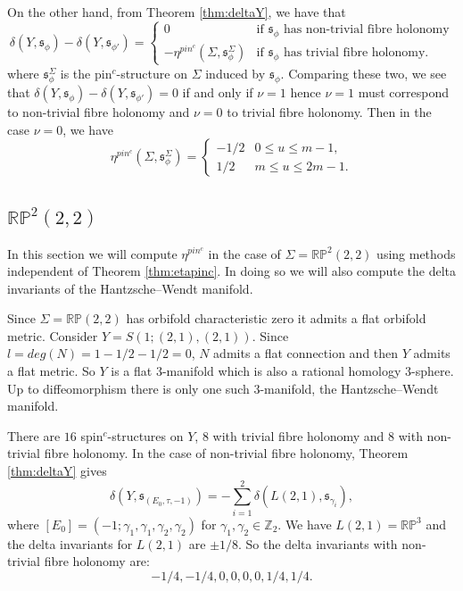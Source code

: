 \documentclass{amsart}
\theoremstyle{definition}
\theoremstyle{remark}
\numberwithin{equation}{section}
\begin{document}
On the other hand, from Theorem \ref{thm:deltaY}, we have that
\[
\delta(Y , \mathfrak{s}_\phi) - \delta(Y , \mathfrak{s}_{\phi'}) = \begin{cases} 0 & \text{if } \mathfrak{s}_\phi \text{ has non-trivial fibre holonomy} \\
-\eta^{pin^c}(\Sigma , \mathfrak{s}^\Sigma_\phi) & \text{if } \mathfrak{s}_\phi \text{ has trivial fibre holonomy}. \end{cases}
\]
where $\mathfrak{s}^\Sigma_\phi$ is the pin$^c$-structure on $\Sigma$ induced by $\mathfrak{s}_\phi$. Comparing these two, we see that $\delta(Y , \mathfrak{s}_\phi) - \delta(Y , \mathfrak{s}_{\phi'}) = 0$ if and only if $\nu = 1$ hence $\nu = 1$ must correspond to non-trivial fibre holonomy and $\nu = 0$ to trivial fibre holonomy. Then in the case $\nu = 0$, we have
\[
\eta^{pin^c}(\Sigma , \mathfrak{s}^\Sigma_\phi) = \begin{cases} -1/2 & 0 \le u \le m-1, \\ 1/2 & m \le u \le 2m-1. \end{cases}
\]




\subsection{$\mathbb{RP}^2(2,2)$}\label{sec:rp22}

In this section we will compute $\eta^{pin^c}$ in the case of $\Sigma = \mathbb{RP}^2(2,2)$ using methods independent of Theorem \ref{thm:etapinc}. In doing so we will also compute the delta invariants of the Hantzsche--Wendt manifold.

Since $\Sigma = \mathbb{RP}(2,2)$ has orbifold characteristic zero it admits a flat orbifold metric. Consider $Y = S( 1 ; (2,1) , (2,1) )$. Since $l = deg(N) = 1 - 1/2 - 1/2 = 0$, $N$ admits a flat connection and then $Y$ admits a flat metric. So $Y$ is a flat $3$-manifold which is also a rational homology $3$-sphere. Up to diffeomorphism there is only one such $3$-manifold, the Hantzsche--Wendt manifold.

There are $16$ spin$^c$-structures on $Y$, $8$ with trivial fibre holonomy and $8$ with non-trivial fibre holonomy. In the case of non-trivial fibre holonomy, Theorem \ref{thm:deltaY} gives
\[
\delta(Y, \mathfrak{s}_{(E_0 , \tau , -1)}) = -\sum_{i=1}^2 \delta( L(2,1) , \mathfrak{s}_{\gamma_i} ),
\]
where $[E_0] = (-1 ; \gamma_1 , \gamma_1 , \gamma_2 , \gamma_2)$ for $\gamma_1,\gamma_2 \in \mathbb{Z}_2$. We have $L(2,1) = \mathbb{RP}^3$ and the delta invariants for $L(2,1)$ are $\pm 1/8$. So the delta invariants with non-trivial fibre holonomy are:
\[
-1/4 , -1/4 , 0 , 0 , 0 , 0 , 1/4 , 1/4.
\]
\end{document}
